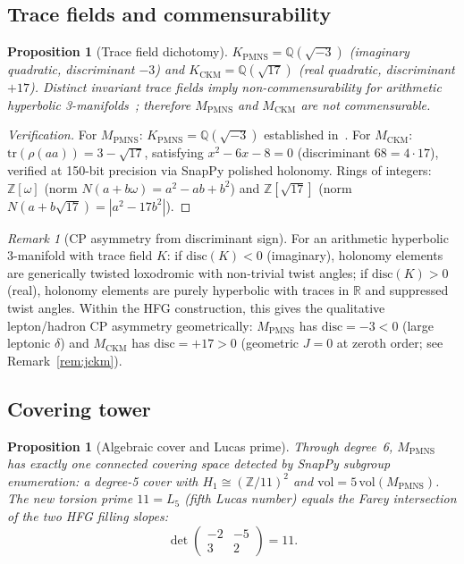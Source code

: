 \documentclass[11pt,a4paper]{article}
\newtheorem{proposition}[theorem]{Proposition}
\theoremstyle{definition}
\theoremstyle{remark}
\newtheorem{remark}[theorem]{Remark}
\newcommand{\ZZ}{\mathbb{Z}}
\newcommand{\QQ}{\mathbb{Q}}
\newcommand{\MPMNS}{M_{\mathrm{PMNS}}}
\newcommand{\MCKM}{M_{\mathrm{CKM}}}
\newcommand{\KPMNS}{K_{\mathrm{PMNS}}}
\newcommand{\KCKM}{K_{\mathrm{CKM}}}
\newcommand{\Zom}{\mathbb{Z}[\omega]}
\newcommand{\Zsev}{\mathbb{Z}[\sqrt{17}]}
\begin{document}
\subsection{Trace fields and commensurability}

\begin{proposition}[Trace field dichotomy]
\label{prop:tracefields}
$\KPMNS = \QQ(\sqrt{-3})$ (imaginary quadratic,
discriminant $-3$) and $\KCKM = \QQ(\sqrt{17})$
(real quadratic, discriminant $+17$).
Distinct invariant trace fields imply non-commensurability
for arithmetic hyperbolic 3-manifolds~\cite{MaclachlanReid};
therefore $\MPMNS$ and $\MCKM$ are not commensurable.
\end{proposition}

\begin{proof}[Verification]
For $\MPMNS$: $\KPMNS = \QQ(\sqrt{-3})$ established in~\cite{Chinburg98}.
For $\MCKM$: $\mathrm{tr}(\rho(aa)) = 3-\sqrt{17}$,
satisfying $x^2-6x-8=0$ (discriminant $68=4\cdot17$),
verified at 150-bit precision via SnapPy polished holonomy.
Rings of integers: $\Zom$ (norm $N(a+b\omega)=a^2-ab+b^2$) and
$\Zsev$ (norm $N(a+b\sqrt{17})=|a^2-17b^2|$).
\end{proof}

\begin{remark}[CP asymmetry from discriminant sign]
\label{rem:cp_asym}
For an arithmetic hyperbolic 3-manifold with trace field $K$:
if $\mathrm{disc}(K)<0$ (imaginary), holonomy elements are
generically twisted loxodromic with non-trivial twist angles;
if $\mathrm{disc}(K)>0$ (real), holonomy elements are purely
hyperbolic with traces in $\mathbb{R}$ and suppressed twist angles.
Within the HFG construction, this gives the qualitative
lepton/hadron CP asymmetry geometrically:
$\MPMNS$ has $\mathrm{disc}=-3 < 0$ (large leptonic $\delta$)
and $\MCKM$ has $\mathrm{disc}=+17 > 0$ (geometric $J=0$
at zeroth order; see Remark~\ref{rem:jckm}).
\end{remark}

\subsection{Covering tower}

\begin{proposition}[Algebraic cover and Lucas prime]
\label{prop:cover}
Through degree~6, $\MPMNS$ has exactly one connected
covering space detected by SnapPy subgroup enumeration:
a degree-5 cover with $H_1 \cong (\ZZ/11)^2$ and
$\mathrm{vol} = 5\,\mathrm{vol}(\MPMNS)$.
The new torsion prime $11 = L_5$ (fifth Lucas number) equals
the Farey intersection of the two HFG filling slopes:
\[
  \det\!\begin{pmatrix}-2&-5\\3&2\end{pmatrix} = 11.
\]
\end{proposition}
\end{document}
